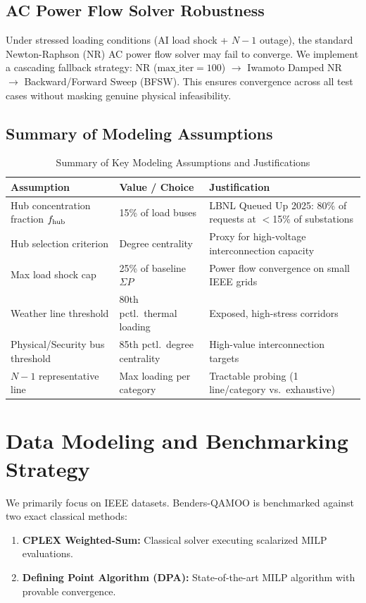 \documentclass[11pt]{article}
\begin{document}
\subsection{AC Power Flow Solver Robustness}
Under stressed loading conditions (AI load shock + $N-1$ outage), the standard Newton-Raphson (NR) AC power flow solver may fail to converge. We implement a cascading fallback strategy: NR ($\text{max\_iter}=100$) $\rightarrow$ Iwamoto Damped NR $\rightarrow$ Backward/Forward Sweep (BFSW). This ensures convergence across all test cases without masking genuine physical infeasibility.

\subsection{Summary of Modeling Assumptions}
\begin{table}[h!]
\centering
\caption{Summary of Key Modeling Assumptions and Justifications}
\label{tab:assumptions-summary}
\vspace{0.5em}
\begin{tabular}{p{4.0cm}p{3.5cm}p{5.5cm}}
\toprule
\textbf{Assumption} & \textbf{Value / Choice} & \textbf{Justification} \\
\midrule
Hub concentration fraction $f_{\rm hub}$ & 15\% of load buses & LBNL Queued Up 2025: 80\% of requests at $<$15\% of substations \\
\addlinespace
Hub selection criterion & Degree centrality & Proxy for high-voltage interconnection capacity \\
\addlinespace
Max load shock cap & 25\% of baseline $\Sigma P$ & Power flow convergence on small IEEE grids \\
\addlinespace
Weather line threshold & 80th pctl.\ thermal loading & Exposed, high-stress corridors \\
\addlinespace
Physical/Security bus threshold & 85th pctl.\ degree centrality & High-value interconnection targets \\
\addlinespace
$N-1$ representative line & Max loading per category & Tractable probing (1 line/category vs.\ exhaustive) \\
\bottomrule
\end{tabular}
\end{table}

\section{Data Modeling and Benchmarking Strategy}
We primarily focus on IEEE datasets. Benders-QAMOO is benchmarked against two exact classical methods:
\begin{enumerate}[leftmargin=*,noitemsep,topsep=0pt]
  \item \textbf{CPLEX Weighted-Sum:} Classical solver executing scalarized MILP evaluations.
  \item \textbf{Defining Point Algorithm (DPA):} State-of-the-art MILP algorithm with provable convergence.
\end{enumerate}
\end{document}
